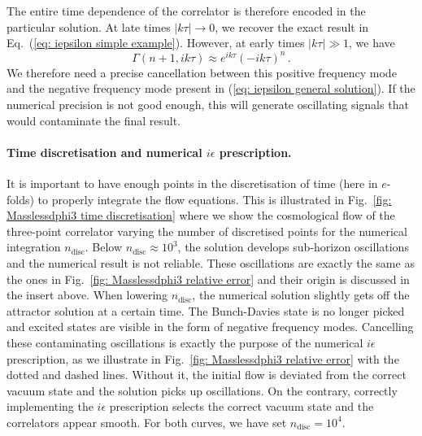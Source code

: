 \documentclass[11pt]{article}
\numberwithin{equation}{section} %
\begin{document}
\begin{framed}
{\vskip 4pt
The entire time dependence of the correlator is therefore encoded in the particular solution. At late times $|k\tau|\rightarrow 0$, we recover the exact result in Eq.~(\ref{eq: iepsilon simple example}). However, at early times $|k\tau|\gg1$, we have 
\begin{equation}
    \Gamma(n+1, ik\tau) \approx e^{ik\tau} (-ik\tau)^n\,.
\end{equation}
We therefore need a precise cancellation between this positive frequency mode and the negative frequency mode present in (\ref{eq: iepsilon general solution}). If the numerical precision is not good enough, this will generate oscillating signals that would contaminate the final result.

}
\end{framed}


\paragraph{Time discretisation and numerical $i\epsilon$ prescription.} It is important to have enough points in the discretisation of time (here in $e$-folds) to properly integrate the flow equations. This is illustrated in Fig.~\ref{fig: Masslessdphi3 time discretisation} where we show the cosmological flow of the three-point correlator varying the number of discretised points for the numerical integration $n_{\text{disc}}$. Below $n_{\text{disc}} \approx 10^3$, the solution develops sub-horizon oscillations and the numerical result is not reliable. These oscillations are exactly the same as the ones in Fig.~\ref{fig: Masslessdphi3 relative error} and their origin is discussed in the insert above. When lowering $n_{\text{disc}}$, the numerical solution slightly gets off the attractor solution at a certain time. The Bunch-Davies state is no longer picked and excited states are visible in the form of negative frequency modes. Cancelling these contaminating oscillations is exactly the purpose of the numerical $i\epsilon$ prescription, as we illustrate in Fig.~\ref{fig: Masslessdphi3 relative error} with the dotted and dashed lines. Without it, the initial flow is deviated from the correct vacuum state and the solution picks up oscillations. On the contrary, correctly implementing the $i\epsilon$ prescription selects the correct vacuum state and the correlators appear smooth. For both curves, we have set $n_{\text{disc}} = 10^4$.
\end{document}
